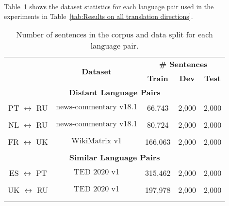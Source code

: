 Table~\ref{tab:apdx_dataset statistics} shows the dataset statistics for each language pair used in the experiments in Table~\ref{tab:Results on all translation directions}.

\begin{table}[h!]
\centering
\begin{adjustbox}{width=\columnwidth, center}
\renewcommand{\arraystretch}{1.05}
\begin{tabular}{ccccc}
\Xhline{3\arrayrulewidth}
\multirow{2}{*}{\textbf{Lang-pair}} & \multirow{2}{*}{\textbf{Dataset}} 
& \multicolumn{3}{c}{\textbf{\# Sentences}} \\ \cline{3-5} 
 & & \textbf{Train} & \textbf{Dev} & \textbf{Test} \\ \hline\hline 

\multicolumn{5}{c}{\textbf{Distant Language Pairs}} \\  \hline 

\multirow{2}{*}{PT $\leftrightarrow$ RU} & news-commentary v18.1 & \multirow{2}{*}{66,743} & \multirow{2}{*}{2,000} & \multirow{2}{*}{2,000} \\
 & \cite{opus} & & & \\ \hline  
 
 \multirow{2}{*}{NL $\leftrightarrow$ RU} & news-commentary v18.1 & \multirow{2}{*}{80,724} & \multirow{2}{*}{2,000} & \multirow{2}{*}{2,000} \\
 & \cite{opus} & & & \\ \hline  

 
 \multirow{2}{*}{FR $\leftrightarrow$ UK} & WikiMatrix v1 & \multirow{2}{*}{166,063} & \multirow{2}{*}{2,000} & \multirow{2}{*}{2,000} \\
 & \cite{schwenk2019wikimatrix} & & & \\ \hline \hline

 \multicolumn{5}{c}{\textbf{Similar Language Pairs}} \\  \hline 

\multirow{2}{*}{ES $\leftrightarrow$ PT} & TED 2020 v1& \multirow{2}{*}{315,462} & \multirow{2}{*}{2,000} & \multirow{2}{*}{2,000} \\
 & \cite{ted2020} & & & \\ \hline  
 
 \multirow{2}{*}{UK $\leftrightarrow$ RU} & TED 2020 v1& \multirow{2}{*}{197,978} & \multirow{2}{*}{2,000} & \multirow{2}{*}{2,000} \\
 & \cite{ted2020} & & & \\ 



\Xhline{3\arrayrulewidth}
\end{tabular}
\end{adjustbox}
\caption{Number of sentences in the corpus and data split for each language pair.}
\label{tab:apdx_dataset statistics}
\end{table}



